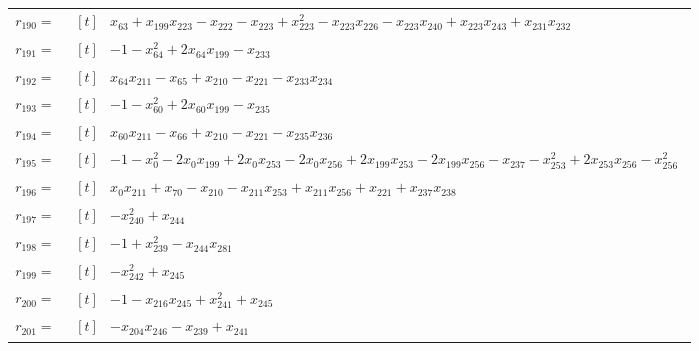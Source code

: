 \begin{longtable}{@{}r p{0.92\linewidth}@{}}
$r_{190}=$ & $\begin{aligned}[t]&x_{63}+x_{199}x_{223}-x_{222}-x_{223}+x_{223}^{2}-x_{223}x_{226}-x_{223}x_{240}+x_{223}x_{243}+x_{231}x_{232}\end{aligned}$ \\[2pt]
$r_{191}=$ & $\begin{aligned}[t]&-1-x_{64}^{2}+2x_{64}x_{199}-x_{233}\end{aligned}$ \\[2pt]
$r_{192}=$ & $\begin{aligned}[t]&x_{64}x_{211}-x_{65}+x_{210}-x_{221}-x_{233}x_{234}\end{aligned}$ \\[2pt]
$r_{193}=$ & $\begin{aligned}[t]&-1-x_{60}^{2}+2x_{60}x_{199}-x_{235}\end{aligned}$ \\[2pt]
$r_{194}=$ & $\begin{aligned}[t]&x_{60}x_{211}-x_{66}+x_{210}-x_{221}-x_{235}x_{236}\end{aligned}$ \\[2pt]
$r_{195}=$ & $\begin{aligned}[t]&-1-x_{0}^{2}-2x_{0}x_{199}+2x_{0}x_{253}-2x_{0}x_{256}+2x_{199}x_{253}-2x_{199}x_{256}-x_{237}-x_{253}^{2}+2x_{253}x_{256}-x_{256}^{2}\end{aligned}$ \\[2pt]
$r_{196}=$ & $\begin{aligned}[t]&x_{0}x_{211}+x_{70}-x_{210}-x_{211}x_{253}+x_{211}x_{256}+x_{221}+x_{237}x_{238}\end{aligned}$ \\[2pt]
$r_{197}=$ & $\begin{aligned}[t]&-x_{240}^{2}+x_{244}\end{aligned}$ \\[2pt]
$r_{198}=$ & $\begin{aligned}[t]&-1+x_{239}^{2}-x_{244}x_{281}\end{aligned}$ \\[2pt]
$r_{199}=$ & $\begin{aligned}[t]&-x_{242}^{2}+x_{245}\end{aligned}$ \\[2pt]
$r_{200}=$ & $\begin{aligned}[t]&-1-x_{216}x_{245}+x_{241}^{2}+x_{245}\end{aligned}$ \\[2pt]
$r_{201}=$ & $\begin{aligned}[t]&-x_{204}x_{246}-x_{239}+x_{241}\end{aligned}$ \\[2pt]

\end{longtable}
